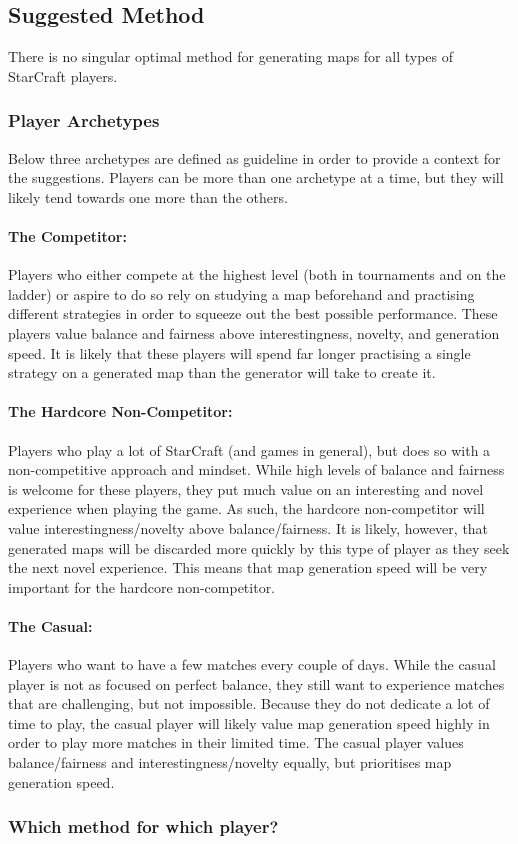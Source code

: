 \subsection{Suggested Method}
There is no singular optimal method for generating maps for all types of StarCraft players. 

\subsubsection{Player Archetypes}
Below three archetypes are defined as guideline in order to provide a context for the suggestions. Players can be more than one archetype at a time, but they will likely tend towards one more than the others.

\paragraph{The Competitor:} Players who either compete at the highest level (both in tournaments and on the ladder) or aspire to do so rely on studying a map beforehand and practising different strategies in order to squeeze out the best possible performance. These players value balance and fairness above interestingness, novelty, and generation speed. It is likely that these players will spend far longer practising a single strategy on a generated map than the generator will take to create it.

\paragraph{The Hardcore Non-Competitor:} Players who play a lot of StarCraft (and games in general), but does so with a non-competitive approach and mindset. While high levels of balance and fairness is welcome for these players, they put much value on an interesting and novel experience when playing the game. As such, the hardcore non-competitor will value interestingness/novelty above balance/fairness. It is likely, however, that generated maps will be discarded more quickly by this type of player as they seek the next novel experience. This means that map generation speed will be very important for the hardcore non-competitor.

\paragraph{The Casual:} Players who want to have a few matches every couple of days. While the casual player is not as focused on perfect balance, they still want to experience matches that are challenging, but not impossible. Because they do not dedicate a lot of time to play, the casual player will likely value map generation speed highly in order to play more matches in their limited time. The casual player values balance/fairness and interestingness/novelty equally, but prioritises map generation speed.

\subsubsection{Which method for which player?}

